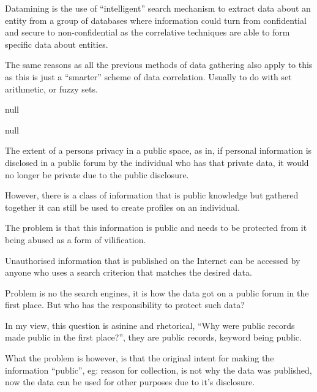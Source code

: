 
Datamining is the use of ``intelligent'' search mechanism to extract data about an entity from a group of databases where information could turn from confidential and secure to non-confidential as the correlative techniques are able to form specific data about entities.

The same reasons as all the previous methods of data gathering also apply to this as this is just a ``smarter'' scheme of data correlation. Usually to do with set arithmetic, or fuzzy sets.


null


null




The extent of a persons privacy in a public space, as in, if personal information is disclosed in a public forum by the individual who has that private data, it would no longer be private due to the public disclosure.

However, there is a class of information that is public knowledge but gathered together it can still be used to create profiles on an individual.

The problem is that this information is public and needs to be protected from it being abused as a form of vilification.


Unauthorised information that is published on the Internet can be accessed by anyone who uses a search criterion that matches the desired data.

Problem is no the search engines, it is how the data got on a public forum in the first place. But who has the responsibility to protect such data?


In my view, this question is asinine and rhetorical, ``Why were public records made public in the first place?'', they are public records, keyword being public.

What the problem is however, is that the original intent for making the information ``public'', eg: reason for collection, is not why the data was published, now the data can be used for other purposes due to it's disclosure.


